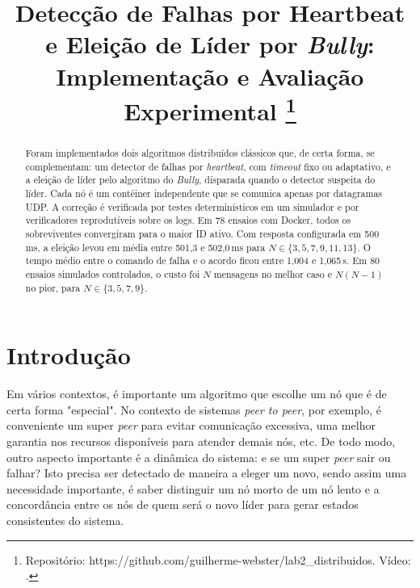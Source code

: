 \documentclass[conference]{IEEEtran}
\newif\ifrascunho
\DeclareRobustCommand{\todo}[1]{\ifrascunho{\color{red}\textbf{[#1]}}\fi}
\newcommand{\repolink}{https://github.com/guilherme-webster/lab2_distribuidos}
\newcommand{\videolink}{\todo{URL do vídeo}}
\begin{document}
\title{Detecção de Falhas por Heartbeat e Eleição de
Líder por \textit{Bully}: Implementação e
Avaliação Experimental
\thanks{Repositório: \repolink. Vídeo: \videolink.}
}

\author{
\and
{}
}

\maketitle
\begin{abstract}
Foram implementados dois algoritmos distribuídos clássicos que, de certa forma, se complementam: um detector de falhas por \textit{heartbeat}, com \textit{timeout} fixo ou adaptativo, e a eleição de líder pelo algoritmo do \textit{Bully}, disparada quando o detector suspeita do líder. Cada nó é um contêiner independente que se comunica apenas por datagramas UDP. A correção é verificada por testes determinísticos em um simulador e por verificadores reprodutíveis sobre os logs. Em 78 ensaios com Docker, todos os sobreviventes convergiram para o maior ID ativo. Com resposta configurada em 500\,ms, a eleição levou em média entre 501,3 e 502,0\,ms para $N\in\{3,5,7,9,11,13\}$. O tempo médio entre o comando de falha e o acordo ficou entre 1,004 e 1,065\,s. Em 80 ensaios simulados controlados, o custo foi $N$ mensagens no melhor caso e $N(N-1)$ no pior, para $N\in\{3,5,7,9\}$.
\end{abstract}

\section{Introdução}
\label{sec:intro}

Em vários contextos, é importante um algoritmo que escolhe um nó que é de certa forma "especial". No contexto de sistemas \textit{peer to peer}, por exemplo, é conveniente um super \textit{peer} para evitar comunicação excessiva, uma melhor garantia nos recursos disponíveis para atender demais nós, etc. De todo modo, outro aspecto importante é a dinâmica do sistema: e se um super \textit{peer} sair ou falhar? Isto precisa ser detectado de maneira a eleger um novo, sendo assim uma necessidade importante, é saber distinguir um nó morto de um nó lento e a concordância entre os nós de quem será o novo líder para gerar estados consistentes do sistema.
\end{document}

